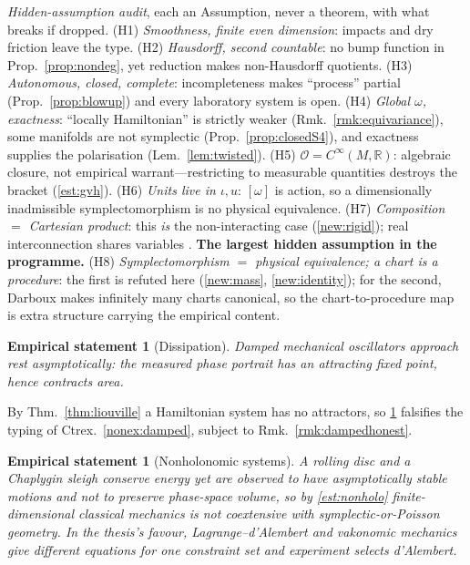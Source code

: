 \documentclass[12pt,a4paper]{article}
\theoremstyle{definition}
\theoremstyle{plain}
\theoremstyle{commentary}
\newtheorem{empirical}[definition]{Empirical statement}
\newcommand{\R}{\mathbb{R}}
\newcommand{\Cinf}{C^{\infty}}
\newcommand{\Oc}{\mathcal{O}}
\begin{document}
\noindent\emph{Hidden-assumption audit}, each an Assumption, never a theorem, with what breaks if
dropped. (H1) \emph{Smoothness, finite even dimension}: impacts and dry friction leave the type.
(H2) \emph{Hausdorff, second countable}: no bump function in Prop.~\ref{prop:nondeg}, yet reduction
makes non-Hausdorff quotients. (H3) \emph{Autonomous, closed, complete}: incompleteness makes
``process'' partial (Prop.~\ref{prop:blowup}) and every laboratory system is open. (H4) \emph{Global
$\omega$, exactness}: ``locally Hamiltonian'' is strictly weaker (Rmk.~\ref{rmk:equivariance}), some
manifolds are not symplectic (Prop.~\ref{prop:closedS4}), and exactness supplies the polarisation
(Lem.~\ref{lem:twisted}). (H5) \emph{$\Oc=\Cinf(M,\R)$}: algebraic closure, not empirical
warrant---restricting to measurable quantities destroys the bracket (\ref{est:gvh}). (H6) \emph{Units
live in $\iota,u$}: $[\omega]$ is action, so a dimensionally inadmissible symplectomorphism is no
physical equivalence. (H7) \emph{Composition $=$ Cartesian product}: this \emph{is} the
non-interacting case (\ref{new:rigid}); real interconnection shares variables \cite{Willems2007}.
\textbf{The largest hidden assumption in the programme.} (H8) \emph{Symplectomorphism $=$ physical
equivalence; a chart is a procedure}: the first is refuted here (\ref{new:mass},
\ref{new:identity}); for the second, Darboux \cite{McDuffSalamon2017} makes infinitely many charts
canonical, so the chart-to-procedure map is extra structure carrying the empirical content.

\begin{empirical}[Dissipation]\label{emp:damped}
Damped mechanical oscillators approach rest asymptotically: the measured phase portrait has an
attracting fixed point, hence contracts area.
\end{empirical}

By Thm.~\ref{thm:liouville} a Hamiltonian system has no attractors, so \ref{emp:damped} falsifies
the typing of Ctrex.~\ref{nonex:damped}, subject to Rmk.~\ref{rmk:dampedhonest}. 

\begin{empirical}[Nonholonomic systems]\label{emp:rolling}
A rolling disc and a Chaplygin sleigh conserve energy yet are observed to have asymptotically stable
motions and not to preserve phase-space volume, so by \ref{est:nonholo} finite-dimensional classical
mechanics is \emph{not} coextensive with symplectic-or-Poisson geometry. In the thesis's favour,
Lagrange--d'Alembert and vakonomic mechanics give \emph{different} equations for one constraint set
and experiment selects d'Alembert.
\end{empirical}
\end{document}
